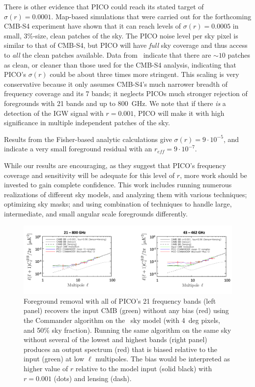 \documentclass[PICOReport.tex]{subfiles}
\begin{document}
There is other evidence that PICO could reach its stated target of $\sigma(r) = 0.0001$. Map-based simulations that were carried out for the forthcoming CMB-S4 experiment have shown that it can reach levels of $\sigma(r) = 0.0005$ in small, 3\%-size, clean patches of the sky. 
The PICO noise level per sky pixel is similar to that of CMB-S4, but PICO will have {\it full} sky coverage and thus access to {\it all} the clean patches available. Data from \planck\ indicate that there are $\sim10$ %
patches as clean, or cleaner than those used for the CMB-S4 analysis, indicating that PICO's $\sigma(r)$ could be about three times more stringent. This scaling is very conservative because it only assumes CMB-S4's much narrower breadth of frequency coverage and its 7 bands; %
it neglects PICOs much stronger rejection of foregrounds with 21 bands and up to 800~GHz.  We note that if there {\it is} a detection of the \ac{IGW} signal with $r=0.001$, PICO will make it with high significance in multiple independent patches of the sky. 

Results from the Fisher-based analytic calculations give $\sigma(r) = 9 \cdot 10^{-5}$, and indicate a very small foreground residual with an $r_{eff} = 9 \cdot 10^{-7}.$

While our results are encouraging, as they suggest that PICO's frequency coverage and sensitivity will be adequate for this level of $r$, more work should be invested to gain complete confidence. This work includes running numerous realizations of different sky models, and analyzing them with various techniques; optimizing sky masks; and using combination of techniques to handle large, intermediate, and small angular scale foregrounds differently. 
\begin{figure}
{\centerline {
\includegraphics[width=4.5in]{images/commander_foregrounds_BB.png} }}
\caption{Foreground removal with all of PICO's 21 frequency bands (left panel) recovers the input CMB (green) without any bias (red) using the Commander algorithm on the \planck\ sky model (with 4~deg pixels, and 50\% sky fraction). Running the same algorithm on the same sky without several of the lowest and highest bands (right panel) produces an output spectrum (red) that is biased relative to the input (green) at low $\ell$ multipoles. The bias would be interpreted as higher value of $r$ relative to the model input (solid black) with $r=0.001$ (dots) and lensing (dash). 
\label{fig:commander}}
\vspace{-0.0in}
\end{figure}
\end{document}
